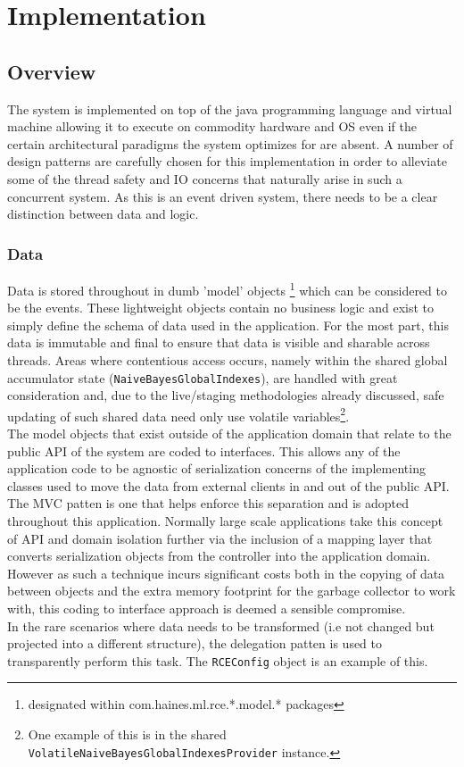 \documentclass[a4paper,11pt]{scrreprt}
\begin{document}
\chapter{Implementation}
\VerbatimFootnotes
\section{Overview}
The system is implemented on top of the java programming language and virtual machine allowing it to execute on commodity hardware and OS even if the certain architectural paradigms the system optimizes for are absent. A number of design patterns are carefully chosen for this implementation in order to alleviate some of the thread safety and IO concerns that naturally arise in such a concurrent system. As this is an event driven system, there needs to be a clear distinction between data and logic. 
\subsection{Data}
Data is stored throughout in dumb 'model' objects \footnote{designated within com.haines.ml.rce.*.model.* packages} which can be considered to be the events. These lightweight objects contain no business logic and exist to simply define the schema of data used in the application. For the most part, this data is immutable and final to ensure that data is visible and sharable across threads. Areas where contentious access occurs, namely within the shared global accumulator state (\verb|NaiveBayesGlobalIndexes|), are handled with great consideration and, due to the live/staging methodologies already discussed, safe updating of such shared data need only use volatile variables\footnote{One example of this is in the shared \verb|VolatileNaiveBayesGlobalIndexesProvider| instance.}.\\
The model objects that exist outside of the application domain that relate to the public API of the system are coded to interfaces. This allows any of the application code to be agnostic of serialization concerns of the implementing classes used to move the data from external clients in and out of the public API. The MVC patten is one that helps enforce this separation and is adopted throughout this application. Normally large scale applications take this concept of API and domain isolation further via the inclusion of a mapping layer that converts serialization objects from the controller into the application domain. However as such a technique incurs significant costs both in the copying of data between objects and the extra memory footprint for the garbage collector to work with, this coding to interface approach is deemed a sensible compromise. \\
In the rare scenarios where data needs to be transformed (i.e not changed but projected into a different structure), the delegation patten\cite{design-patterns} is used to transparently perform this task. The \verb|RCEConfig| object is an example of this.
\end{document}
